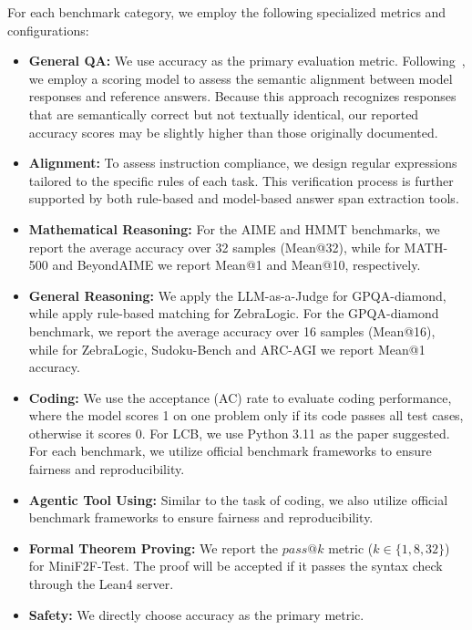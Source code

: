 For each benchmark category, we employ the following specialized metrics and configurations:
\begin{itemize}
    \item\textbf{General QA: }We use accuracy as the primary evaluation metric. Following~\citep{meituan2025longcat_flash_chat}, we employ a scoring model to assess the semantic alignment between model responses and reference answers. Because this approach recognizes responses that are semantically correct but not textually identical, our reported accuracy scores may be slightly higher than those originally documented.
    
    \item\textbf{Alignment: }To assess instruction compliance, we design regular expressions tailored to the specific rules of each task. This verification process is further supported by both rule-based and model-based answer span extraction tools.
    \item\textbf{Mathematical Reasoning: } For the AIME and HMMT benchmarks, we report the average accuracy over 32 samples (Mean@32), while for MATH-500 
    and BeyondAIME we report Mean@1 and Mean@10, respectively.
    
    \item\textbf{General Reasoning: }We apply the LLM-as-a-Judge for GPQA-diamond, while apply rule-based matching for ZebraLogic. For the GPQA-diamond benchmark, we report the average accuracy over 16 samples (Mean@16), while for ZebraLogic, Sudoku-Bench 
    and ARC-AGI we report Mean@1 accuracy.
    \item\textbf{Coding:} We use the acceptance (AC) rate to evaluate coding performance, where the model scores 1 on one problem only if its code passes all test cases, otherwise it scores 0. For LCB, we use Python 3.11 as the paper suggested. 
    For each benchmark, we utilize official benchmark frameworks to ensure fairness and reproducibility. 
    \item\textbf{Agentic Tool Using: } Similar to the task of coding, we also utilize official benchmark frameworks to ensure fairness and reproducibility. 
    \item\textbf{Formal Theorem Proving: } We report the $pass@k$ metric ($k\in\{1, 8, 32\}$) for MiniF2F-Test. The proof will be accepted if it passes the syntax check through the Lean4 server.
    \item\textbf{Safety: }We directly choose accuracy as the primary metric.
\end{itemize}

